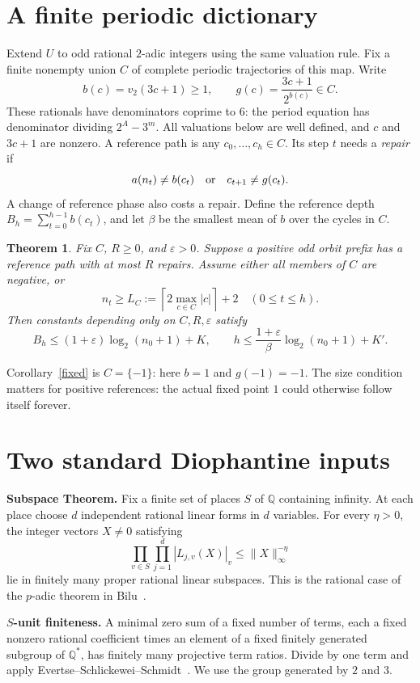 \documentclass[11pt]{article}
\newtheorem{theorem}{Theorem}
\begin{document}
\section{A finite periodic dictionary}
Extend $U$ to odd rational $2$-adic integers using the same valuation rule. Fix a finite nonempty union $C$ of complete periodic trajectories of this map. Write
\[
b(c)=v_2(3c+1)\ge1,\qquad g(c)=\frac{3c+1}{2^{b(c)}}\in C.
\]
These rationals have denominators coprime to $6$: the period equation has denominator dividing $2^A-3^m$. All valuations below are well defined, and $c$ and $3c+1$ are nonzero.
A reference path is any $c_0,\ldots,c_h\in C$. Its step $t$ needs a \emph{repair} if
\[
a(n_t)\ne b(c_t)\quad\hbox{or}\quad c_{t+1}\ne g(c_t).
\]
A change of reference phase also costs a repair. Define the reference depth
$B_h=\sum_{t=0}^{h-1}b(c_t)$, and let $\beta$ be the smallest mean of $b$ over the cycles in $C$.
\begin{theorem}\label{main}
Fix $C$, $R\ge0$, and $\varepsilon>0$. Suppose a positive odd orbit prefix has a reference path with at most $R$ repairs. Assume either all members of $C$ are negative, or
\[
n_t\ge L_C:=\left\lceil2\max_{c\in C}|c|\right\rceil+2
\quad(0\le t\le h).
\]
Then constants depending only on $C,R,\varepsilon$ satisfy
\[
B_h\le(1+\varepsilon)\log_2(n_0+1)+K,
\qquad
h\le\frac{1+\varepsilon}{\beta}\log_2(n_0+1)+K'.
\]
\end{theorem}
Corollary~\ref{fixed} is $C=\{-1\}$: here $b=1$ and $g(-1)=-1$. The size condition matters for positive references: the actual fixed point $1$ could otherwise follow itself forever.

\section{Two standard Diophantine inputs}
\noindent\textbf{Subspace Theorem.}
Fix a finite set of places $S$ of $\mathbb Q$ containing infinity. At each place choose $d$ independent rational linear forms in $d$ variables. For every $\eta>0$, the integer vectors $X\ne0$ satisfying
\[
\prod_{v\in S}\prod_{j=1}^d|L_{j,v}(X)|_v
\le \|X\|_\infty^{-\eta}
\]
lie in finitely many proper rational linear subspaces. This is the rational case of the $p$-adic theorem in Bilu~\cite[Theorem 2.3]{bilu}.

\medskip\noindent\textbf{$S$-unit finiteness.}
A minimal zero sum of a fixed number of terms, each a fixed nonzero rational coefficient times an element of a fixed finitely generated subgroup of $\mathbb Q^*$, has finitely many projective term ratios. Divide by one term and apply Evertse--Schlickewei--Schmidt~\cite[Theorem 1.1]{ess}. We use the group generated by $2$ and $3$.
\end{document}
